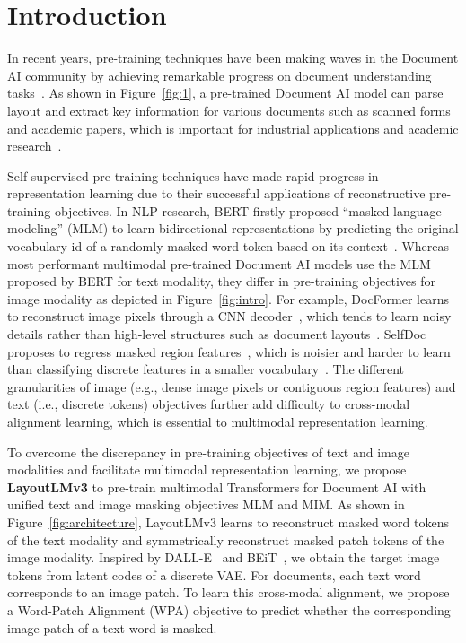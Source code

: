 \documentclass[sigconf]{acmart}
\begin{document}
\section{Introduction}

In recent years, pre-training techniques have been making waves in the Document AI community by achieving remarkable progress on document understanding tasks~\cite{xu2020layoutlm,xu-etal-2021-layoutlmv2,xu2021layoutxlm,pramanik2020towards,garncarek2021lambert,hong2022bros,Powalski2021GoingFB,wu2021lampret,Li2021StructuralLMSP,li2021selfdoc,Appalaraju_2021_ICCV,li2021structext,gu2021unidoc,wang2022LiLT,gu2022xylayoutlm,lee2022formnet}. As shown in Figure~\ref{fig:1}, a pre-trained Document AI model can parse layout and extract key information for various documents such as scanned forms and academic papers, which is important for industrial applications and academic research~\cite{cui2021document}.

Self-supervised pre-training techniques have made rapid progress in representation learning due to their successful applications of reconstructive pre-training objectives.
In NLP research, BERT firstly proposed ``masked language modeling'' (MLM) to learn bidirectional representations by predicting the original vocabulary id of a randomly masked word token based on its context~\cite{devlin2019bert}.
Whereas most performant multimodal pre-trained Document AI models use the MLM proposed by BERT for text modality, they differ in pre-training objectives for image modality as depicted in Figure~\ref{fig:intro}.
For example, DocFormer learns to reconstruct image pixels through a CNN decoder~\cite{Appalaraju_2021_ICCV}, which tends to learn noisy details rather than high-level structures such as document layouts~\cite{salimans2017pixelcnn++,ramesh2021zero}.
SelfDoc proposes to regress masked region features~\cite{li2021selfdoc}, which is noisier and harder to learn than classifying discrete features in a smaller vocabulary~\cite{cho2020x,huang2021unifying}.
The different granularities of image (e.g., dense image pixels or contiguous region features) and text (i.e., discrete tokens) objectives further add difficulty to cross-modal alignment learning, which is essential to multimodal representation learning.

To overcome the discrepancy in pre-training objectives of text and image modalities and facilitate multimodal representation learning, we propose \textbf{LayoutLMv3} to pre-train multimodal Transformers for Document AI with unified text and image masking objectives MLM and MIM.
As shown in Figure~\ref{fig:architecture}, LayoutLMv3 learns to reconstruct masked word tokens of the text modality and symmetrically reconstruct masked patch tokens of the image modality.
Inspired by DALL-E~\cite{ramesh2021zero} and BEiT~\cite{bao2022beit}, we obtain the target image tokens from latent codes of a discrete VAE.
For documents, each text word corresponds to an image patch. To learn this cross-modal alignment, we propose a Word-Patch Alignment (WPA) objective to predict whether the corresponding image patch of a text word is masked.
\end{document}
